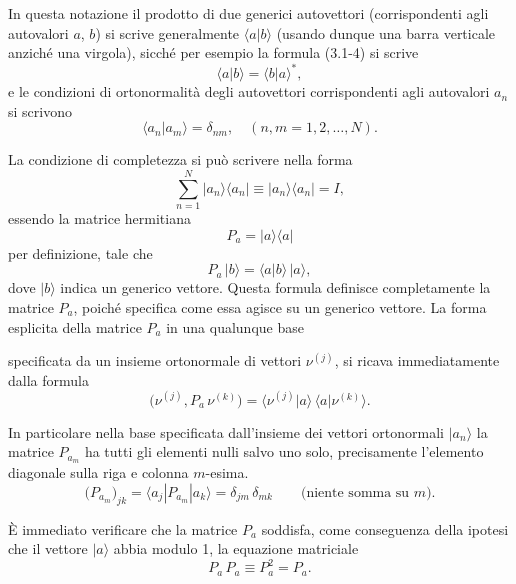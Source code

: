 \documentclass[11pt, a4paper]{book}
\numberwithin{equation}{section}
\begin{document}
In questa notazione il prodotto di due generici autovettori (corrispondenti
agli autovalori $a$, $b$) si scrive generalmente $\langle a | b \rangle$
(usando dunque una barra verticale anziché una virgola), sicché per esempio
la formula (3.1-4) si scrive
\[
\langle a | b \rangle = \langle b | a \rangle^*,
\]
e le condizioni di ortonormalità degli autovettori corrispondenti agli
autovalori $a_n$ si scrivono
\begin{equation}
\langle a_n | a_m \rangle = \delta_{nm}, \quad (n,m = 1,2,\ldots,N).
\end{equation}

La condizione di completezza si può scrivere nella forma
\begin{equation}
\sum_{n=1}^{N} |a_n\rangle\langle a_n| \equiv |a_n\rangle\langle a_n| = I,
\end{equation}
essendo la matrice hermitiana
\begin{equation}
P_a = |a\rangle\langle a|
\end{equation}
per definizione, tale che
\begin{equation}
P_a\,|b\rangle = \langle a|b\rangle\,|a\rangle,
\end{equation}
dove $|b\rangle$ indica un generico vettore. Questa formula definisce
completamente la matrice $P_a$, poiché specifica come essa agisce su un
generico vettore. La forma esplicita della matrice $P_a$ in una qualunque
base


specificata da un insieme ortonormale di vettori $\nu^{(j)}$, si ricava
immediatamente dalla formula
\begin{equation}
\bigl(\nu^{(j)}, P_a\,\nu^{(k)}\bigr)
= \langle \nu^{(j)} | a \rangle\,\langle a | \nu^{(k)} \rangle.
\end{equation}

In particolare nella base specificata dall'insieme dei vettori ortonormali
$|a_n\rangle$ la matrice $P_{a_m}$ ha tutti gli elementi nulli salvo uno
solo, precisamente l'elemento diagonale sulla riga e colonna $m$-esima.
\begin{equation}
\bigl(P_{a_m}\bigr)_{jk}
= \langle a_j | P_{a_m} | a_k \rangle
= \delta_{jm}\,\delta_{mk}
\qquad \text{(niente somma su }m\text{)}.
\end{equation}

È immediato verificare che la matrice $P_a$ soddisfa, come conseguenza
della ipotesi che il vettore $|a\rangle$ abbia modulo 1, la equazione
matriciale
\begin{equation}
P_a\,P_a \equiv P_a^2 = P_a.
\end{equation}
\end{document}

